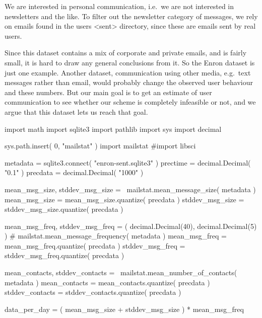 We are interested in personal communication, i.e.~we are not interested in 
newsletters and the like.
To filter out the newsletter category of messages, we rely on emails found in 
the users <sent> directory, since these are emails sent by real users.


Since this dataset contains a mix of corporate and private emails, and is 
fairly small, it is hard to draw any general conclusions from it.
So the Enron dataset is just one example.
Another dataset, communication using other media, e.g.~text messages rather 
than email, would probably change the observed user behaviour and these 
numbers.
But our main goal is to get an estimate of user communication to see whether 
our scheme is completely infeasible or not, and we argue that this dataset lets 
us reach that goal.

\begin{pycode}[random]
import math
import sqlite3
import pathlib
import sys
import decimal

sys.path.insert( 0, "mailstat" )
import mailstat
#import libsci

metadata = sqlite3.connect( "enron-sent.sqlite3" )
prectime = decimal.Decimal( "0.1" )
precdata = decimal.Decimal( "1000" )

mean_msg_size, stddev_msg_size = \
  mailstat.mean_message_size( metadata )
mean_msg_size = mean_msg_size.quantize( precdata )
stddev_msg_size = stddev_msg_size.quantize( precdata )

mean_msg_freq, stddev_msg_freq = ( decimal.Decimal(40), decimal.Decimal(5) )
#  mailstat.mean_message_frequency( metadata )
mean_msg_freq = mean_msg_freq.quantize( precdata )
stddev_msg_freq = stddev_msg_freq.quantize( precdata )

mean_contacts, stddev_contacts = \
  mailstat.mean_number_of_contacts( metadata )
mean_contacts = mean_contacts.quantize( precdata )
stddev_contacts = stddev_contacts.quantize( precdata )

data_per_day = ( mean_msg_size + stddev_msg_size ) * mean_msg_freq
\end{pycode}


